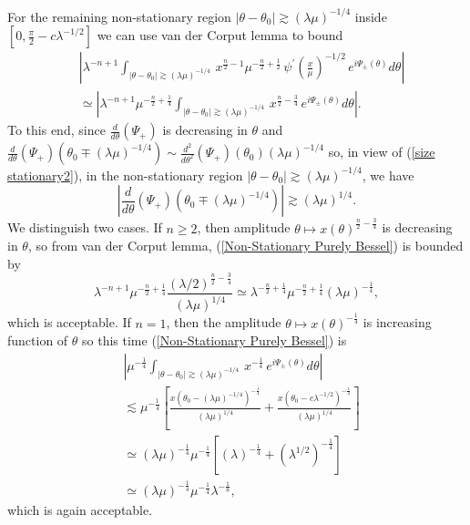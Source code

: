 \documentclass[11pt, reqno]{amsart}
\theoremstyle{plain}
\theoremstyle{remark}
\theoremstyle{example}
\theoremstyle{definition}
\numberwithin{equation}{section}
\begin{document}
For the remaining non-stationary region $| \theta - \theta_{0} | \gtrsim  (\lambda \mu)^{-1/4}  $ inside $[0,  \frac{\pi}{2} - c \lambda^{-1/2}] $ we can use van der Corput lemma to bound
\begin{equation}\label{Non-Stationary Purely Bessel}
   \begin{split}
       & \left| \lambda^{-n+1}  \int_{ | \theta - \theta_{0} | \gtrsim  (\lambda \mu)^{-1/4}} \,   x^{\frac{n}{2}-1} \mu^{-\frac{n}{2}+ \frac{1}{2}  } \, \psi^{\prime}({\textstyle\frac{x}{\mu}})^{-1/2}   \, e^{i \Psi_{\pm}(\theta) }    d \theta \right|\\
       & \simeq \left| \lambda^{-n+1} \mu^{-\frac{n}{2}+ \frac{1}{4}  } \int_{ | \theta - \theta_{0} | \gtrsim  (\lambda \mu)^{-1/4}} \,   x^{\frac{n}{2}- \frac{3}{4}}  \,  e^{i \Psi_{\pm}(\theta) }    d \theta \right|.
   \end{split}
\end{equation}
To this end, since $ \frac{d}{d \theta}(\Psi_{+})$ is decreasing in $\theta$ and $\frac{d}{d \theta}(\Psi_{+})(\theta_{0} \mp (\lambda \mu)^{-1/4}) \sim \frac{d^2}{d \theta^2}(\Psi_{+})(\theta_{0}) (\lambda \mu)^{-1/4}$ so, in view of (\ref{size stationary2}),  in the non-stationary region $| \theta - \theta_{0} | \gtrsim  (\lambda \mu)^{-1/4}  $, we have
\begin{equation*}
    \left| \frac{d}{d \theta}(\Psi_{+})(\theta_{0} \mp (\lambda \mu)^{-1/4}) \right|\gtrsim (\lambda \mu)^{1/4}.
\end{equation*}
We distinguish two cases. If $n\geq2$, then amplitude $\theta \mapsto x(\theta)^{\frac{n}{2} - \frac{3}{4}}$ is decreasing in $\theta$, so from van der Corput lemma, (\ref{Non-Stationary Purely Bessel}) is bounded by
\begin{equation*}
    \lambda^{-n+1} \mu^{-\frac{n}{2}+ \frac{1}{4}} \frac{  (\lambda/2)^{\frac{n}{2} - \frac{3}{4}}  }{   (\lambda \mu )^{1/4}   } \simeq \lambda^{-\frac{n}{2}+ \frac{1}{4}} \mu^{-\frac{n}{2}+ \frac{1}{4}} ( \lambda \mu)^{- \frac{1}{4}},
\end{equation*}
which is acceptable. If $n=1$, then the amplitude $\theta \mapsto x(\theta)^{ - \frac{1}{4}}$ is increasing function of $\theta$ so this time (\ref{Non-Stationary Purely Bessel}) is 
\begin{equation*}
  \begin{split}
       & \left| \mu^{- \frac{1}{4}}  \int_{ | \theta - \theta_{0} | \gtrsim  (\lambda \mu)^{-1/4}} \,   x^{-\frac{1}{4}}   \, e^{i \Psi_{\pm}(\theta) }    d \theta \right|\\
       & \lesssim  \mu^{- \frac{1}{4}} \left[  \frac{  x(\theta_{0} - (\lambda \mu)^{-1/4})^{-\frac{1}{4}}   }{(\lambda \mu)^{1/4}} + \frac{  x(\theta_{0} - c \lambda^{-1/2} )^{-\frac{1}{4}}   }{(\lambda \mu)^{1/4}}   \right]\\
       & \simeq (\lambda \mu)^{- \frac{1}{4}} \mu^{-\frac{1}{4}} \left[ (\lambda)^{-\frac{1}{4}} + (\lambda^{1/2})^{- \frac{1}{4}}\right]\\
       & \simeq (\lambda \mu)^{- \frac{1}{4}} \mu^{-\frac{1}{4}} \lambda^{-\frac{1}{8}},
  \end{split}
\end{equation*}
which is again acceptable. 
\end{document}
